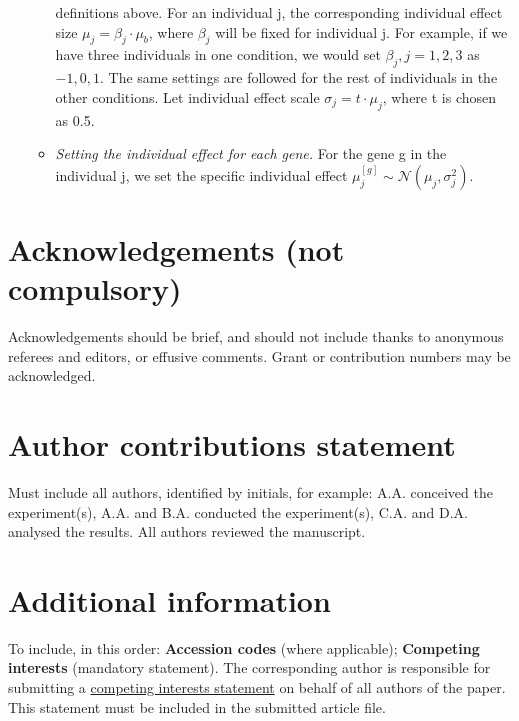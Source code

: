 \documentclass[fleqn,10pt]{wlscirep}
\begin{document}
\begin{itemize}
\begin{itemize}
      definitions above. For an individual j, the corresponding
      individual effect size $\mu_j = \beta_j\cdot \mu_b$, where $\beta_j$
      will be fixed for individual j. For example, if we have three
      individuals in one condition, we would set $\beta_j, j = 1, 2,3$
      as $-1, 0, 1$. The same settings are followed for the rest of
      individuals in the other conditions.
      Let individual effect scale
      $\sigma_j = t \cdot \mu_j$, where t is chosen as 0.5.
    \item {\it Setting the individual effect for each gene.} For the
      gene g in the individual j, we set the specific individual
      effect $\mu_j^{[g]} \sim \mathcal{N}(\mu_j, \sigma_j^2)$.
    \end{itemize}
\end{itemize}



\section*{Acknowledgements (not compulsory)}
Acknowledgements should be brief, and should not include thanks to
anonymous referees and editors, or effusive comments. Grant or
contribution numbers may be acknowledged.

\section*{Author contributions statement}
Must include all authors, identified by initials, for example:
A.A. conceived the experiment(s), A.A. and B.A. conducted the
experiment(s), C.A. and D.A. analysed the results.  All authors
reviewed the manuscript.

\section*{Additional information}
To include, in this order: \textbf{Accession codes} (where
applicable); \textbf{Competing interests} (mandatory statement). The
corresponding author is responsible for submitting a
\href{http://www.nature.com/srep/policies/index.html#competing}{competing
interests statement} on behalf of all authors of the paper. This
statement must be included in the submitted article file.
\end{document}

